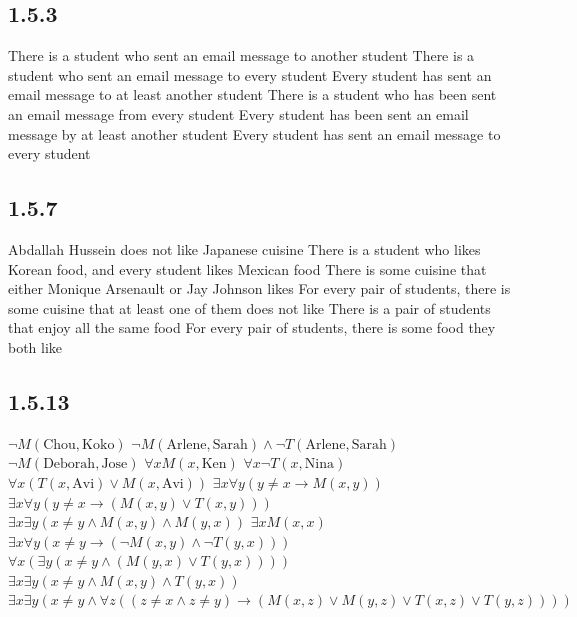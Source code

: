 \documentclass[12pt,titlepage]{extarticle}
\begin{document}
\subsection*{1.5.3}
\begin{tasks}
    \task There is a student who sent an email message to another student
    \task There is a student who sent an email message to every student
    \task Every student has sent an email message to at least another student
    \task There is a student who has been sent an email message from every student
    \task Every student has been sent an email message by at least another student
    \task Every student has sent an email message to every student
\end{tasks}

\subsection*{1.5.7}
\begin{tasks}
    \task Abdallah Hussein does not like Japanese cuisine
    \task There is a student who likes Korean food, and every student likes Mexican food
    \task There is some cuisine that either Monique Arsenault or Jay Johnson likes
    \task For every pair of students, there is some cuisine that at least one of them does not like
    \task There is a pair of students that enjoy all the same food
    \task For every pair of students, there is some food they both like
\end{tasks}

\subsection*{1.5.13}
\begin{tasks}
    \task $\lnot M (\text{Chou}, \text{Koko}) $
    \task $\lnot M(\text{Arlene}, \text{Sarah}) \land  \lnot T(\text{Arlene}, \text{Sarah}) $
    \task $\lnot M (\text{Deborah}, \text{Jose}) $
    \task $\forall xM(x, \text{Ken})$
    \task $\forall x\lnot T(x, \text{Nina}) $
    \task $\forall x(T(x, \text{Avi}) \lor  M(x, \text{Avi})) $
    \task $\exists x\forall y(y \neq  x \rightarrow  M(x, y)) $
    \task $\exists x\forall y(y \neq  x \rightarrow  (M(x, y) \lor  T(x, y)))$
    \task $\exists x\exists y(x \neq  y \land  M(x, y) \land  M(y, x)) $
    \task $\exists xM(x, x) $
    \task $\exists x\forall y(x \neq  y \rightarrow  (\lnot M(x, y)\land \lnot T(y, x))) $
    \task $\forall x(\exists y(x \neq  y\land (M(y, x)\lor T(y, x))))$
    \task $\exists x\exists y(x \neq  y \land  M(x, y) \land  T(y, x)) $
    \task $\exists x\exists y(x \neq  y \land  \forall z((z \neq  x \land  z \neq  y) \rightarrow  (M (x, z) \lor  M (y, z) \lor  T(x, z) \lor  T(y, z))))$
\end{tasks}
\end{document}
